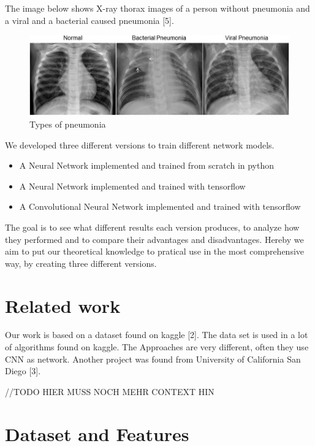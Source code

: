 \documentclass{article}
\begin{document}
The image below shows X-ray thorax images of a person without pneumonia and a viral and a bacterial caused pneumonia [5].

\begin{figure}[h]
  \centering
  \includegraphics[scale=1]{images/typesofpneumonia.jpg}
  \caption{Types of pneumonia}
  \label{fig:types_of_pneumonia}
\end{figure}

We developed three different versions to train different network models.

\begin{itemize}
  \item A Neural Network implemented and trained from scratch in python
  \item A Neural Network implemented and trained with tensorflow
  \item A Convolutional Neural Network implemented and trained with tensorflow
\end{itemize}

The goal is to see what different results each version produces, 
to analyze how they performed and to compare their advantages and disadvantages. 
Hereby we aim to put our theoretical knowledge to pratical use in the most comprehensive way, 
by creating three different versions. 

\section{Related work}

Our work is based on a dataset found on kaggle [2]. 
The data set is used in a lot of algorithms found on kaggle. 
The Approaches are very different, often they use CNN as network. 
Another project was found from University of California San Diego [3].

//TODO
HIER MUSS NOCH MEHR CONTEXT HIN

\section{Dataset and Features}
\label{sec:dataset_and_features}
\end{document}
